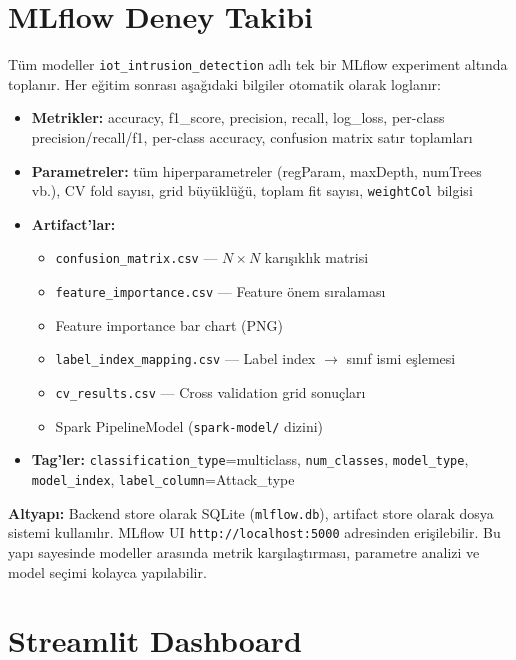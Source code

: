 \documentclass[12pt,a4paper]{article}
\begin{document}
\section{MLflow Deney Takibi}

Tüm modeller \texttt{iot\_intrusion\_detection} adlı tek bir MLflow experiment altında toplanır. Her eğitim sonrası aşağıdaki bilgiler otomatik olarak loglanır:

\begin{itemize}[noitemsep]
  \item \textbf{Metrikler:} accuracy, f1\_score, precision, recall, log\_loss, per-class precision/recall/f1, per-class accuracy, confusion matrix satır toplamları
  \item \textbf{Parametreler:} tüm hiperparametreler (regParam, maxDepth, numTrees vb.), CV fold sayısı, grid büyüklüğü, toplam fit sayısı, \texttt{weightCol} bilgisi
  \item \textbf{Artifact'lar:}
    \begin{itemize}[noitemsep]
      \item \texttt{confusion\_matrix.csv} — $N \times N$ karışıklık matrisi
      \item \texttt{feature\_importance.csv} — Feature önem sıralaması
      \item Feature importance bar chart (PNG)
      \item \texttt{label\_index\_mapping.csv} — Label index $\to$ sınıf ismi eşlemesi
      \item \texttt{cv\_results.csv} — Cross validation grid sonuçları
      \item Spark PipelineModel (\texttt{spark-model/} dizini)
    \end{itemize}
  \item \textbf{Tag'ler:} \texttt{classification\_type}=multiclass, \texttt{num\_classes}, \texttt{model\_type}, \texttt{model\_index}, \texttt{label\_column}=Attack\_type
\end{itemize}

\textbf{Altyapı:} Backend store olarak SQLite (\texttt{mlflow.db}), artifact store olarak dosya sistemi kullanılır. MLflow UI \texttt{http://localhost:5000} adresinden erişilebilir. Bu yapı sayesinde modeller arasında metrik karşılaştırması, parametre analizi ve model seçimi kolayca yapılabilir.

\section{Streamlit Dashboard}
\end{document}
